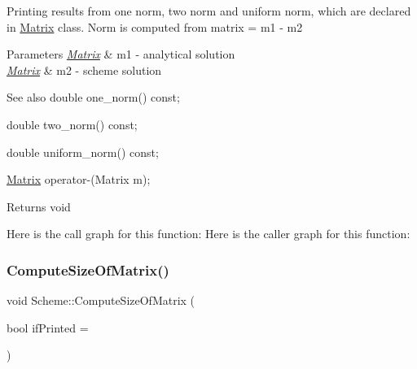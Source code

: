 Printing results from one norm, two norm and uniform norm, which are declared in \mbox{\hyperlink{class_matrix}{Matrix}} class. Norm is computed from matrix = m1 -\/ m2 
\begin{DoxyParams}{Parameters}
{\em \mbox{\hyperlink{class_matrix}{Matrix}}} & m1 -\/ analytical solution \\
\hline
{\em \mbox{\hyperlink{class_matrix}{Matrix}}} & m2 -\/ scheme solution \\
\hline
\end{DoxyParams}
\begin{DoxySeeAlso}{See also}
double one\+\_\+norm() const; 

double two\+\_\+norm() const; 

double uniform\+\_\+norm() const; 

\mbox{\hyperlink{class_matrix}{Matrix}} operator-\/(\+Matrix m); 
\end{DoxySeeAlso}
\begin{DoxyReturn}{Returns}
void 
\end{DoxyReturn}
Here is the call graph for this function\+:
Here is the caller graph for this function\+:
\mbox{\label{class_scheme_a0364e328d78e84be15d293a66d946008}} 
\subsubsection{\texorpdfstring{Compute\+Size\+Of\+Matrix()}{ComputeSizeOfMatrix()}}
{\footnotesize\ttfamily void Scheme\+::\+Compute\+Size\+Of\+Matrix (\begin{DoxyParamCaption}\item[{bool}]{if\+Printed = {} }\end{DoxyParamCaption})\hspace{0.3cm}{\ttfamily [protected]}}

